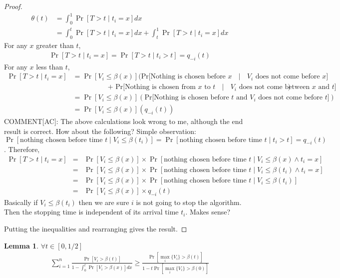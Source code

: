 \documentclass[10pt, letterpaper, twoside]{article}
\newtheorem{lemma}[theorem]{Lemma}
\begin{document}
	\begin{proof}
		\begin{align*}
			\theta(t) &= \int_{0}^{1} \Pr[T > t \mid t_{i} = x] dx\\
			&= \int_{0}^{t} \Pr[T > t \mid t_{i} = x] dx + \int_{t}^{1} \Pr[T > t \mid t_{i} = x] dx
		\end{align*}
		For any $x$ greater than $t$,
		\begin{align*}
			\Pr[T > t \mid t_{i} = x] = \Pr[T > t \mid t_{i} > t] = q_{-i}(t)
		\end{align*}
		For any $x$ less than $t$,
		\begin{align*}
			\Pr[T > t \mid t_{i} = x] &= \Pr[V_{i} \leq \beta(x)] (\text{Pr[Nothing is chosen before $x$ $\mid$ $V_{i}$ does not come before $x$]} \\
			&\quad \quad \quad \quad \quad \text{+ Pr[Nothing is chosen from $x$ to $t$ $\mid$ $V_{i}$ does not come between $x$ and $t$]})\\
			&= \Pr[V_{i} \leq \beta(x)](\text{Pr[Nothing is chosen before $t$ and $V_{i}$ does not come before $t$]})\\
			&= \Pr[V_{i} \leq \beta(x)] (q_{-i}(t))
		\end{align*}
COMMENT[AC]: The above calculations look wrong to me, although the end result is correct. How about the following?
Simple observation: $\Pr[\text{nothing chosen before time }t \mid V_i\leq\beta(t_i)]=\Pr[\text{nothing chosen before time }t \mid t_i>t]=q_{-i}(t)$. Therefore,
\begin{eqnarray*}
\Pr[T > t \mid t_{i} = x] & = & \Pr[V_{i} \leq \beta(x)] \times \Pr[\text{nothing chosen before time }t \mid V_{i} \leq \beta(x) \wedge t_{i} = x]\\
 & = & \Pr[V_{i} \leq \beta(x)] \times \Pr[\text{nothing chosen before time }t \mid V_{i} \leq \beta(t_i) \wedge t_{i} = x]\\
 & = & \Pr[V_{i} \leq \beta(x)] \times \Pr[\text{nothing chosen before time }t \mid V_{i} \leq \beta(t_i)]\\
 & = & \Pr[V_{i} \leq \beta(x)] \times q_{-i}(t)
\end{eqnarray*}
Basically if $V_{i} \leq \beta(t_i)$ then we are sure $i$ is not going to stop the algorithm. Then the stopping time is independent of its arrival time $t_i$. Makes sense?

		Putting the inequalities and rearranging gives the result.
	\end{proof}
\begin{lemma}
$\forall t \in [0,1/2]$
	\begin{align*}
		\sum_{i=1}^{n} \frac{\Pr[V_{i}>\beta(t)]}{1-\int_{0}^{t} \Pr[V_{i}>\beta(x)] dx} \geq \frac{\Pr[\max_{i} \{V_{i}\} > \beta(t)]}{1-t\Pr[\max_{i} \{V_{i}\} > \beta(0)]}
	\end{align*}
\end{lemma}
\end{document}
